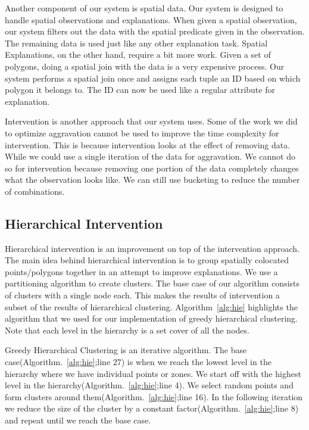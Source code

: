 Another component of our system is spatial data. Our system is designed to handle spatial observations and explanations. When given a spatial observation, our system filters out the data with the spatial predicate given in the observation. The remaining data is used just like any other explanation task. Spatial Explanations, on the other hand, require a bit more work. Given a set of polygons, doing a spatial join with the data is a very expensive process. Our system performs a spatial join once and assigns each tuple an ID based on which polygon it belongs to. The ID can now be used like a regular attribute for explanation.


\label{intervention_impl}

Intervention is another approach that our system uses. Some of the work we did to optimize aggravation cannot be used to improve the time complexity for intervention. This is because intervention looks at the effect of removing data. While we could use a single iteration of the data for aggravation. We cannot do so for intervention because removing one portion of the data completely changes what the observation looks like. We can still use bucketing to reduce the number of combinations.


\subsection{Hierarchical Intervention}
\label{sec:hie_impl}
Hierarchical intervention is an improvement on top of the intervention approach. The main idea behind hierarchical intervention is to group spatially colocated points/polygons together in an attempt to improve explanations. We use a partitioning algorithm to create clusters. The base case of our algorithm consists of clusters with a single node each. This makes the results of intervention a subset of the results of hierarchical clustering. Algorithm~\ref{alg:hie} highlights the algorithm that we used for our implementation of greedy hierarchical clustering. Note that each level in the hierarchy is a set cover of all the nodes.

Greedy Hierarchical Clustering is an iterative algorithm. The base case(Algorithm.~\ref{alg:hie};line 27) is when we reach the lowest level in the hierarchy where we have individual points or zones. We start off with the highest level in the hierarchy(Algorithm.~\ref{alg:hie};line 4). We select random points and form clusters around them(Algorithm.~\ref{alg:hie};line 16). In the following iteration we reduce the size of the cluster by a constant factor(Algorithm.~\ref{alg:hie};line 8) and repeat until we reach the base case.


